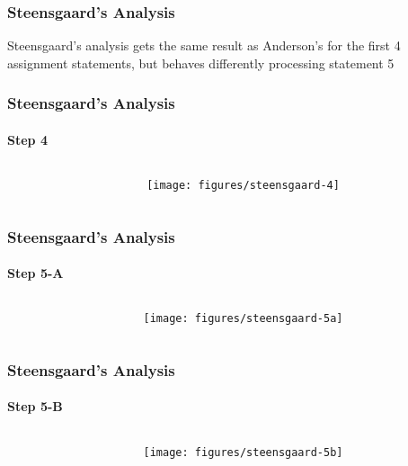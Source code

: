 \documentclass[]{beamer}
\begin{document}
\begin{frame}
  \frametitle{Steensgaard's Analysis}
  Steensgaard's analysis gets the same result as Anderson's for the first 4 assignment
  statements, but behaves differently processing statement 5
\end{frame}

\begin{frame}
  \frametitle{Steensgaard's Analysis}
  \framesubtitle{Step 4}
  \begin{columns}
    \begin{column}{.4\textwidth}
      
      
    \end{column}
    \begin{column}{.6\textwidth}
      \texttt{[image: figures/steensgaard-4]}
    \end{column}
  \end{columns}
\end{frame}

\begin{frame}
  \frametitle{Steensgaard's Analysis}
  \framesubtitle{Step 5-A}
  \begin{columns}
    \begin{column}{.4\textwidth}
      
      
    \end{column}
    \begin{column}{.6\textwidth}
      \texttt{[image: figures/steensgaard-5a]}
    \end{column}
  \end{columns}
\end{frame}

\begin{frame}
  \frametitle{Steensgaard's Analysis}
  \framesubtitle{Step 5-B}
  \begin{columns}
    \begin{column}{.4\textwidth}
      
      
    \end{column}
    \begin{column}{.6\textwidth}
      \texttt{[image: figures/steensgaard-5b]}
    \end{column}
  \end{columns}
\end{frame}
\end{document}
